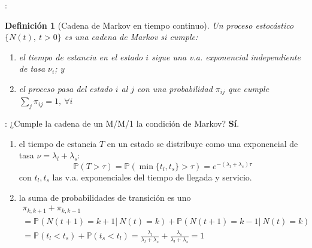\documentclass[xcolor={x11names}]{beamer}
\newtheorem{definicion}{Definición}[section]
\begin{document}


\begin{frame}{\secname: \subsecname}
    \begin{definicion}[Cadena de Markov en tiempo continuo\cite{amable}]
        Un proceso estocástico
        $\{N(t),\ t>0\}$ es una cadena de Markov
        si cumple:
        \begin{enumerate}
            \item el tiempo de estancia
                en el estado $i$ sigue
                una v.a. exponencial
                independiente de tasa $\nu_i$; y
            \item el proceso pasa del estado
                $i$ al $j$ con una
                probabilidad $\pi_{ij}$
                que cumple
                $\sum_j \pi_{ij} = 1,\ \forall i$
        \end{enumerate}
    \end{definicion}
\end{frame}




\begin{frame}{\secname: \subsecname}
    ¿Cumple la cadena de un M/M/1 la condición
    de Markov? \pause \textbf{Sí}.

    \vfill

    \begin{enumerate}
        \item el tiempo de estancia $T$ en un
            estado se distribuye como una
            exponencial de tasa
            $\nu=\lambda_l+\lambda_s$:
            \begin{equation*}
                \mathbb{P}(T>\tau)=\mathbb{P}(\min\{t_l,t_s\}>\tau)=e^{-(\lambda_l+\lambda_s)\tau}
            \end{equation*}
            con $t_l,t_s$ las v.a.
            exponenciales del tiempo de
            llegada y servicio.

        \item la suma de probabilidades
            de transición es uno
            \begin{multline*}
                \pi_{k,k+1}+\pi_{k,k-1}\\
                =\mathbb{P}(N(t+1)=k+1|\ N(t)=k)
                + \mathbb{P}(N(t+1)=k-1|\ N(t)=k)\\
                = \mathbb{P}(t_l<t_s)
                + \mathbb{P}(t_s<t_l)
                = \frac{\lambda_l}{\lambda_l+\lambda_s}
                + \frac{\lambda_s}{\lambda_l+\lambda_s} = 1
            \end{multline*}
    \end{enumerate}

\end{frame}
\end{document}
